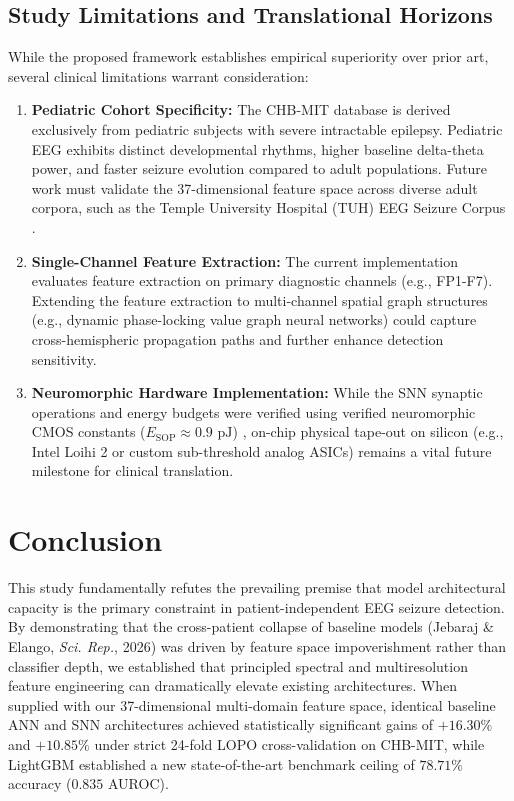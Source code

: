 \documentclass[pdflatex,sn-mathphys-num]{sn-jnl}
\begin{document}
\subsection{Study Limitations and Translational Horizons}
While the proposed framework establishes empirical superiority over prior art, several clinical limitations warrant consideration:
\begin{enumerate}
    \item \textbf{Pediatric Cohort Specificity:} The CHB-MIT database is derived exclusively from pediatric subjects with severe intractable epilepsy. Pediatric EEG exhibits distinct developmental rhythms, higher baseline delta-theta power, and faster seizure evolution compared to adult populations. Future work must validate the 37-dimensional feature space across diverse adult corpora, such as the Temple University Hospital (TUH) EEG Seizure Corpus \cite{obeid2016temple}.
    \item \textbf{Single-Channel Feature Extraction:} The current implementation evaluates feature extraction on primary diagnostic channels (e.g., FP1-F7). Extending the feature extraction to multi-channel spatial graph structures (e.g., dynamic phase-locking value graph neural networks) could capture cross-hemispheric propagation paths and further enhance detection sensitivity.
    \item \textbf{Neuromorphic Hardware Implementation:} While the SNN synaptic operations and energy budgets were verified using verified neuromorphic CMOS constants ($E_{\text{SOP}} \approx 0.9\text{ pJ}$) \cite{davies2018loihi}, on-chip physical tape-out on silicon (e.g., Intel Loihi 2 or custom sub-threshold analog ASICs) remains a vital future milestone for clinical translation.
\end{enumerate}

\section{Conclusion}\label{sec:conclusion}
This study fundamentally refutes the prevailing premise that model architectural capacity is the primary constraint in patient-independent EEG seizure detection. By demonstrating that the cross-patient collapse of baseline models (Jebaraj \& Elango, \textit{Sci. Rep.}, 2026) was driven by feature space impoverishment rather than classifier depth, we established that principled spectral and multiresolution feature engineering can dramatically elevate existing architectures. When supplied with our 37-dimensional multi-domain feature space, identical baseline ANN and SNN architectures achieved statistically significant gains of $+16.30\%$ and $+10.85\%$ under strict 24-fold LOPO cross-validation on CHB-MIT, while LightGBM established a new state-of-the-art benchmark ceiling of $78.71\%$ accuracy ($0.835$ AUROC). 
\end{document}
